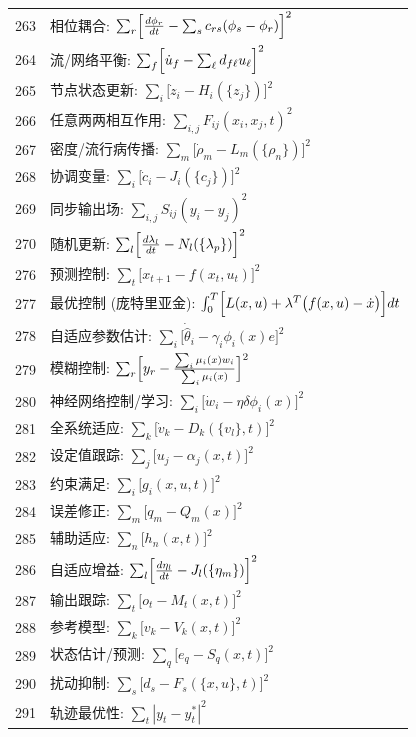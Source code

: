\documentclass[11pt,a4paper]{article}
\begin{document}
\begin{longtable}{r l}
		263 & 相位耦合: $\sum_r\Bigl[\frac{d\phi_r}{dt} - \sum_s c_{rs}(\phi_s-\phi_r)\Bigr]^2$ \\
		264 & 流/网络平衡: $\sum_f\Bigl[\dot u_f - \sum_\ell d_{f\ell}u_\ell\Bigr]^2$ \\
		265 & 节点状态更新: $\sum_i\bigl[\dot z_i - H_i(\{z_j\})\bigr]^2$ \\
		266 & 任意两两相互作用: $\sum_{i,j}F_{ij}(x_i,x_j,t)^2$ \\
		267 & 密度/流行病传播: $\sum_m\bigl[\dot\rho_m - L_m(\{\rho_n\})\bigr]^2$ \\
		268 & 协调变量: $\sum_i\bigl[\dot c_i - J_i(\{c_j\})\bigr]^2$ \\
		269 & 同步输出场: $\sum_{i,j}S_{ij}(y_i-y_j)^2$ \\
		270 & 随机更新: $\sum_l\Bigl[\frac{d\lambda_l}{dt} - N_l(\{\lambda_p\})\Bigr]^2$ \\
		276 & 预测控制: $\sum_t\bigl[x_{t+1} - f(x_t,u_t)\bigr]^2$ \\
		277 & 最优控制 (庞特里亚金): $\int_0^T\Bigl[L(x,u) + \lambda^T\bigl(f(x,u)-\dot x\bigr)\Bigr]dt$ \\
		278 & 自适应参数估计: $\sum_i\bigl[\dot{\hat{\theta}}_i - \gamma_i\phi_i(x)e\bigr]^2$ \\
		279 & 模糊控制: $\sum_r\Bigl[y_r - \frac{\sum_i\mu_i(x)w_i}{\sum_i\mu_i(x)}\Bigr]^2$ \\
		280 & 神经网络控制/学习: $\sum_i\bigl[\dot w_i - \eta\delta\phi_i(x)\bigr]^2$ \\
		281 & 全系统适应: $\sum_k\bigl[\dot v_k - D_k(\{v_l\},t)\Bigr]^2$ \\
		282 & 设定值跟踪: $\sum_j\bigl[u_j - \alpha_j(x,t)\Bigr]^2$ \\
		283 & 约束满足: $\sum_i\bigl[g_i(x,u,t)\bigr]^2$ \\
		284 & 误差修正: $\sum_m\bigl[q_m - Q_m(x)\bigr]^2$ \\
		285 & 辅助适应: $\sum_n\bigl[h_n(x,t)\bigr]^2$ \\
		286 & 自适应增益: $\sum_l\Bigl[\frac{d\eta_l}{dt} - J_l(\{\eta_m\})\Bigr]^2$ \\
		287 & 输出跟踪: $\sum_t\bigl[o_t - M_t(x,t)\Bigr]^2$ \\
		288 & 参考模型: $\sum_k\bigl[v_k - V_k(x,t)\bigr]^2$ \\
		289 & 状态估计/预测: $\sum_q\bigl[e_q - S_q(x,t)\bigr]^2$ \\
		290 & 扰动抑制: $\sum_s\bigl[d_s - F_s(\{x,u\},t)\bigr]^2$ \\
		291 & 轨迹最优性: $\sum_t|y_t - y_t^*|^2$ \\

\end{longtable}
\end{document}
